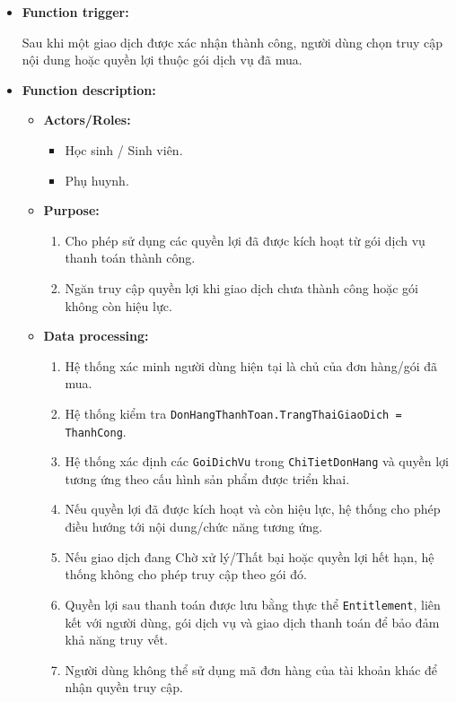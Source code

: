 \documentclass[12pt,a4paper,oneside]{report}
\begin{document}
\begin{itemize}

    \item \textbf{Function trigger:}

    Sau khi một giao dịch được xác nhận thành công, người dùng chọn truy cập nội dung hoặc quyền lợi thuộc gói dịch vụ đã mua.

    \item \textbf{Function description:}

    \begin{itemize}

        \item \textbf{Actors/Roles:}
        \begin{itemize}
            \item Học sinh / Sinh viên.
            \item Phụ huynh.
        \end{itemize}

        \item \textbf{Purpose:}
        \begin{enumerate}
            \item Cho phép sử dụng các quyền lợi đã được kích hoạt từ gói dịch vụ thanh toán thành công.
            \item Ngăn truy cập quyền lợi khi giao dịch chưa thành công hoặc gói không còn hiệu lực.
        \end{enumerate}

        \item \textbf{Data processing:}
        \begin{enumerate}
            \item Hệ thống xác minh người dùng hiện tại là chủ của đơn hàng/gói đã mua.
            \item Hệ thống kiểm tra \texttt{DonHangThanhToan.TrangThaiGiaoDich = ThanhCong}.
            \item Hệ thống xác định các \texttt{GoiDichVu} trong \texttt{ChiTietDonHang} và quyền lợi tương ứng theo cấu hình sản phẩm được triển khai.
            \item Nếu quyền lợi đã được kích hoạt và còn hiệu lực, hệ thống cho phép điều hướng tới nội dung/chức năng tương ứng.
            \item Nếu giao dịch đang Chờ xử lý/Thất bại hoặc quyền lợi hết hạn, hệ thống không cho phép truy cập theo gói đó.
            \item Quyền lợi sau thanh toán được lưu bằng thực thể \texttt{Entitlement}, liên kết với người dùng, gói dịch vụ và giao dịch thanh toán để bảo đảm khả năng truy vết.
            \item Người dùng không thể sử dụng mã đơn hàng của tài khoản khác để nhận quyền truy cập.
        \end{enumerate}


\end{itemize}
\end{itemize}
\end{document}
